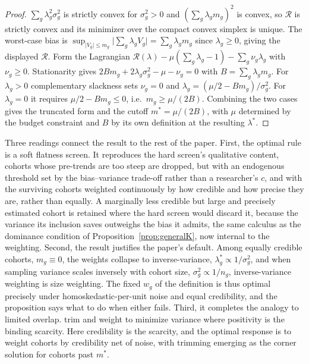 \documentclass[12pt]{article}
\theoremstyle{remark}
\begin{document}
\begin{proof}
$\sum_g\lambda_g^2\sigma_g^2$ is strictly convex for $\sigma_g^2>0$ and $(\sum_g\lambda_g m_g)^2$ is
convex, so $\mathcal R$ is strictly convex and its minimizer over the compact convex simplex is unique. The
worst-case bias is $\sup_{\lvert V_g\rvert\le m_g}\lvert\sum_g\lambda_g V_g\rvert=\sum_g\lambda_g m_g$
since $\lambda_g\ge0$, giving the displayed $\mathcal R$. Form the Lagrangian
$\mathcal R(\lambda)-\mu(\sum_g\lambda_g-1)-\sum_g\nu_g\lambda_g$ with $\nu_g\ge0$. Stationarity gives
$2Bm_g+2\lambda_g\sigma_g^2-\mu-\nu_g=0$ with $B=\sum_g\lambda_g m_g$. For $\lambda_g>0$ complementary
slackness sets $\nu_g=0$ and $\lambda_g=(\mu/2-Bm_g)/\sigma_g^2$. For $\lambda_g=0$ it requires
$\mu/2-Bm_g\le0$, i.e.\ $m_g\ge\mu/(2B)$. Combining the two cases gives the truncated form and the cutoff
$m^\ast=\mu/(2B)$, with $\mu$ determined by the budget constraint and $B$ by its own definition at the
resulting $\lambda^\ast$.
\end{proof}

Three readings connect the result to the rest of the paper. First, the optimal rule is a soft
flatness screen. It reproduces the hard screen's qualitative content, cohorts whose pre-trends are too
steep are dropped, but with an endogenous threshold set by the bias--variance trade-off rather than a
researcher's $c$, and with the surviving cohorts weighted continuously by how credible and how precise they
are, rather than equally. A marginally less credible but large and precisely estimated cohort is retained
where the hard screen would discard it, because the variance its inclusion saves outweighs the bias it
admits, the same calculus as the dominance condition of Proposition~\ref{prop:generalK}, now internal to
the weighting. Second, the result justifies the paper's default. Among equally credible cohorts,
$m_g\equiv0$, the weights collapse to inverse-variance, $\lambda_g^\ast\propto1/\sigma_g^2$, and when
sampling variance scales inversely with cohort size, $\sigma_g^2\propto1/n_g$, inverse-variance weighting
is size weighting. The fixed $w_g$ of the definition is thus optimal precisely under homoskedastic-per-unit
noise and equal credibility, and the proposition says what to do when either fails. Third, it completes the
analogy to limited overlap. \citet{crump2009} trim and \citet{li2018} weight to minimize variance where
positivity is the binding scarcity. Here credibility is the scarcity, and the optimal response is to weight
cohorts by credibility net of noise, with trimming emerging as the corner solution for cohorts past
$m^\ast$.
\end{document}
